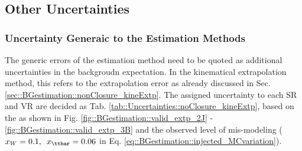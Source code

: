 \clearpage
\subsection{Other Uncertainties} 
\subsubsection{Uncertainty Generaic to the Estimation Methods}  \label{sec::Uncertainties::nonClosure}
The generic errors of the estimation method need to be quoted as additional uncertainties in the backgroudn expectation. 
In the kinematical extrapolation method, this refers to the extrapolation error as already discussed in Sec. \ref{sec::BGestimation::nonClosure_kineExtp}. 
The assigned uncertainty to each SR and VR are decided as Tab. \ref{tab::Uncertainties::noClosure_kineExtp}, based on the 
as shown in Fig. \ref{fig::BGestimation::valid_extp_2J} - \ref{fig::BGestimation::valid_extp_3B} and the observed level of mis-modeling ($x_W=0.1, \,\,\, x_{\ttbar}=0.06$ in Eq. \ref{eq::BGestimation::injected_MCvariation}).


